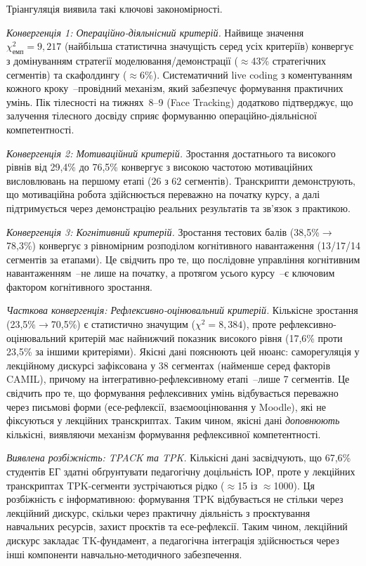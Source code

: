Тріангуляція виявила такі ключові закономірності.

\textit{Конвергенція 1: Операційно-діяльнісний критерій.} Найвище значення $\chi^2_{\text{емп}} = 9{,}217$ (найбільша статистична значущість серед усіх критеріїв) конвергує з домінуванням стратегії моделювання/демонстрації ($\approx$43\% стратегічних сегментів) та скафолдингу ($\approx$6\%). Систематичний live coding з коментуванням кожного кроку~--провідний механізм, який забезпечує формування практичних умінь. Пік тілесності на тижнях~8--9 (Face Tracking) додатково підтверджує, що залучення тілесного досвіду сприяє формуванню операційно-діяльнісної компетентності.

\textit{Конвергенція 2: Мотиваційний критерій.} Зростання достатнього та високого рівнів від 29,4\% до 76,5\% конвергує з високою частотою мотиваційних висловлювань на першому етапі (26 з 62 сегментів). Транскрипти демонструють, що мотиваційна робота здійснюється переважно на початку курсу, а далі підтримується через демонстрацію реальних результатів та зв'язок з практикою.

\textit{Конвергенція 3: Когнітивний критерій.} Зростання тестових балів (38,5\%$\to$78,3\%) конвергує з рівномірним розподілом когнітивного навантаження (13/17/14 сегментів за етапами). Це свідчить про те, що послідовне управління когнітивним навантаженням~--не лише на початку, а протягом усього курсу~--є ключовим фактором когнітивного зростання.

\textit{Часткова конвергенція: Рефлексивно-оцінювальний критерій.} Кількісне зростання (23,5\%$\to$70,5\%) є статистично значущим ($\chi^2 = 8{,}384$), проте рефлексивно-оцінювальний критерій має найнижчий показник високого рівня (17,6\% проти 23,5\% за іншими критеріями). Якісні дані пояснюють цей нюанс: саморегуляція у лекційному дискурсі зафіксована у 38 сегментах (найменше серед факторів CAMIL), причому на інтегративно-рефлексивному етапі~--лише 7 сегментів. Це свідчить про те, що формування рефлексивних умінь відбувається переважно через письмові форми (есе-рефлексії, взаємооцінювання у Moodle), які не фіксуються у лекційних транскриптах. Таким чином, якісні дані \textit{доповнюють} кількісні, виявляючи механізм формування рефлексивної компетентності.

\textit{Виявлена розбіжність: TPACK та TPK.} Кількісні дані засвідчують, що 67,6\% студентів ЕГ здатні обґрунтувати педагогічну доцільність ІОР, проте у лекційних транскриптах TPK-сегменти зустрічаються рідко ($\approx$15 із $\approx$1000). Ця розбіжність є інформативною: формування TPK відбувається не стільки через лекційний дискурс, скільки через практичну діяльність з проєктування навчальних ресурсів, захист проєктів та есе-рефлексії. Таким чином, лекційний дискурс закладає TK-фундамент, а педагогічна інтеграція здійснюється через інші компоненти навчально-методичного забезпечення.

